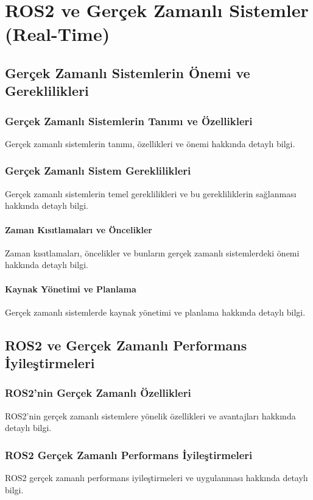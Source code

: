 \chapter{ROS2 ve Gerçek Zamanlı Sistemler (Real-Time)}

\section{Gerçek Zamanlı Sistemlerin Önemi ve Gereklilikleri}
\subsection{Gerçek Zamanlı Sistemlerin Tanımı ve Özellikleri}
Gerçek zamanlı sistemlerin tanımı, özellikleri ve önemi hakkında detaylı bilgi.

\subsection{Gerçek Zamanlı Sistem Gereklilikleri}
Gerçek zamanlı sistemlerin temel gereklilikleri ve bu gerekliliklerin sağlanması hakkında detaylı bilgi.

\subsubsection{Zaman Kısıtlamaları ve Öncelikler}
Zaman kısıtlamaları, öncelikler ve bunların gerçek zamanlı sistemlerdeki önemi hakkında detaylı bilgi.

\subsubsection{Kaynak Yönetimi ve Planlama}
Gerçek zamanlı sistemlerde kaynak yönetimi ve planlama hakkında detaylı bilgi.

\section{ROS2 ve Gerçek Zamanlı Performans İyileştirmeleri}
\subsection{ROS2'nin Gerçek Zamanlı Özellikleri}
ROS2'nin gerçek zamanlı sistemlere yönelik özellikleri ve avantajları hakkında detaylı bilgi.

\subsection{ROS2 Gerçek Zamanlı Performans İyileştirmeleri}
ROS2 gerçek zamanlı performans iyileştirmeleri ve uygulanması hakkında detaylı bilgi.

